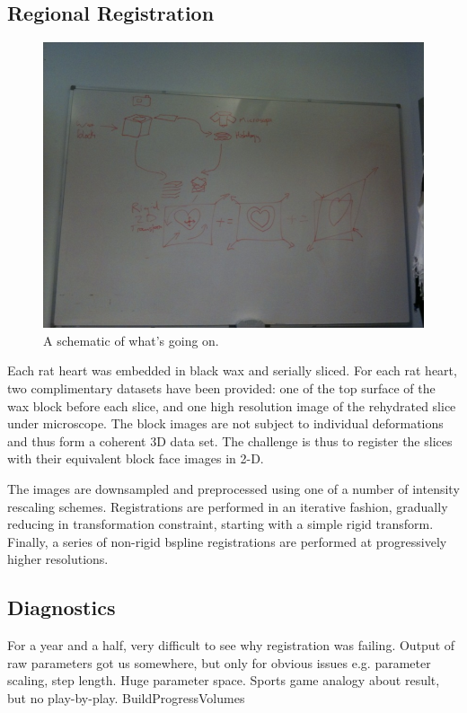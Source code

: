   \subsection{Regional Registration} %
  \label{sub:regional_registration}
    
  
  
  \begin{figure}[htbp]
    \centering
    \includegraphics[height=0.7\textwidth]{Ch6/Figs/process_diagram}
    \caption{A schematic of what's going on.}
  \end{figure}
  

  
  Each rat heart was embedded in black wax and serially sliced. For each rat heart, two complimentary datasets have been provided: one of the top surface of the wax block before each slice, and one high resolution image of the rehydrated slice under microscope. The block images are not subject to individual deformations and thus form a coherent 3D data set. The challenge is thus to register the slices with their equivalent block face images in 2-D.
  
  The images are downsampled and preprocessed using one of a number of intensity rescaling schemes. Registrations are performed in an iterative fashion, gradually reducing in transformation constraint, starting with a simple rigid transform. Finally, a series of non-rigid bspline registrations are performed at progressively higher resolutions.
   
    \subsection{Diagnostics} %
    \label{sub:diagnostics}
      For a year and a half, very difficult to see why registration was failing. Output of raw parameters got us somewhere, but only for obvious issues e.g. parameter scaling, step length. Huge parameter space. Sports game analogy about result, but no play-by-play. BuildProgressVolumes
      

